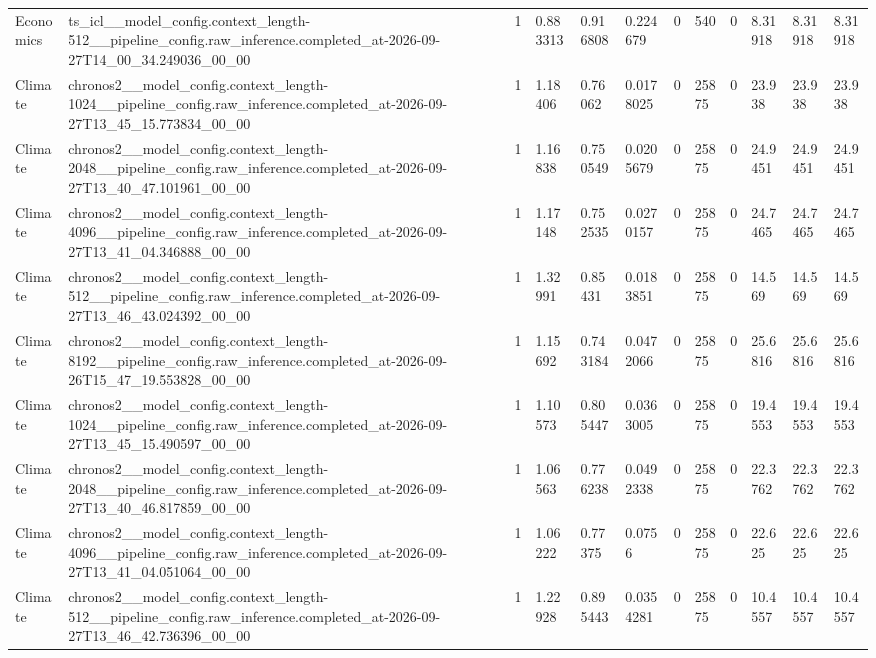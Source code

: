 \begin{tabular}{llllllllllll}
Economics & ts\_icl\_\_model\_config.context\_length-512\_\_pipeline\_config.raw\_inference.completed\_at-2026-09-27T14\_00\_34.249036\_00\_00 & 1 & 0.883313 & 0.916808 & 0.224679 & 0 & 540 & 0 & 8.31918 & 8.31918 & 8.31918 \\
Climate & chronos2\_\_model\_config.context\_length-1024\_\_pipeline\_config.raw\_inference.completed\_at-2026-09-27T13\_45\_15.773834\_00\_00 & 1 & 1.18406 & 0.76062 & 0.0178025 & 0 & 25875 & 0 & 23.938 & 23.938 & 23.938 \\
Climate & chronos2\_\_model\_config.context\_length-2048\_\_pipeline\_config.raw\_inference.completed\_at-2026-09-27T13\_40\_47.101961\_00\_00 & 1 & 1.16838 & 0.750549 & 0.0205679 & 0 & 25875 & 0 & 24.9451 & 24.9451 & 24.9451 \\
Climate & chronos2\_\_model\_config.context\_length-4096\_\_pipeline\_config.raw\_inference.completed\_at-2026-09-27T13\_41\_04.346888\_00\_00 & 1 & 1.17148 & 0.752535 & 0.0270157 & 0 & 25875 & 0 & 24.7465 & 24.7465 & 24.7465 \\
Climate & chronos2\_\_model\_config.context\_length-512\_\_pipeline\_config.raw\_inference.completed\_at-2026-09-27T13\_46\_43.024392\_00\_00 & 1 & 1.32991 & 0.85431 & 0.0183851 & 0 & 25875 & 0 & 14.569 & 14.569 & 14.569 \\
Climate & chronos2\_\_model\_config.context\_length-8192\_\_pipeline\_config.raw\_inference.completed\_at-2026-09-26T15\_47\_19.553828\_00\_00 & 1 & 1.15692 & 0.743184 & 0.0472066 & 0 & 25875 & 0 & 25.6816 & 25.6816 & 25.6816 \\
Climate & chronos2\_\_model\_config.context\_length-1024\_\_pipeline\_config.raw\_inference.completed\_at-2026-09-27T13\_45\_15.490597\_00\_00 & 1 & 1.10573 & 0.805447 & 0.0363005 & 0 & 25875 & 0 & 19.4553 & 19.4553 & 19.4553 \\
Climate & chronos2\_\_model\_config.context\_length-2048\_\_pipeline\_config.raw\_inference.completed\_at-2026-09-27T13\_40\_46.817859\_00\_00 & 1 & 1.06563 & 0.776238 & 0.0492338 & 0 & 25875 & 0 & 22.3762 & 22.3762 & 22.3762 \\
Climate & chronos2\_\_model\_config.context\_length-4096\_\_pipeline\_config.raw\_inference.completed\_at-2026-09-27T13\_41\_04.051064\_00\_00 & 1 & 1.06222 & 0.77375 & 0.0756 & 0 & 25875 & 0 & 22.625 & 22.625 & 22.625 \\
Climate & chronos2\_\_model\_config.context\_length-512\_\_pipeline\_config.raw\_inference.completed\_at-2026-09-27T13\_46\_42.736396\_00\_00 & 1 & 1.22928 & 0.895443 & 0.0354281 & 0 & 25875 & 0 & 10.4557 & 10.4557 & 10.4557 \\

\end{tabular}
